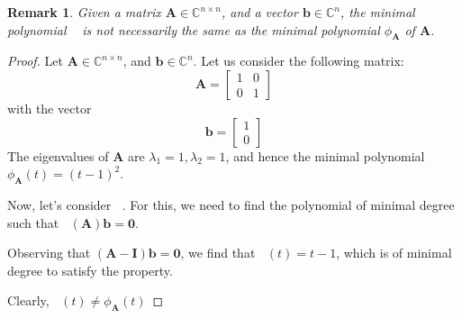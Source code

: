 \documentclass[11pt]{article}
\DeclareMathOperator{\phiAb}{\phi_{\mathbf{A},\mathbf{b}}}
\newtheorem{remark}{Remark}[section]
\numberwithin{equation}{section}
\begin{document}
\begin{remark}
    Given a matrix $\mathbf{A}\in\mathbb{C}^{n\times n}$, and a vector $\mathbf{b}\in\mathbb{C}^n$, the minimal polynomial $\phiAb$ is not necessarily the same as the minimal polynomial $\phi_{\mathbf{A}}$ of $\mathbf{A}$.
\end{remark}
\begin{proof}
    Let $\mathbf{A}\in\mathbb{C}^{n\times n}$, and $\mathbf{b}\in\mathbb{C}^n$. Let us consider the following matrix:
    \begin{equation*}
        \mathbf{A} = \begin{bmatrix}
            1 & 0 \\
            0 & 1
        \end{bmatrix}
    \end{equation*}
    with the vector
    \begin{equation*}
        \mathbf{b} = \begin{bmatrix}
            1 \\
            0
        \end{bmatrix}
    \end{equation*}
    The eigenvalues of $\mathbf{A}$ are $\lambda_1 = 1, \lambda_2 = 1$, and hence the minimal polynomial $\phi_{\mathbf{A}}(t) = (t-1)^2$.

    Now, let's consider $\phiAb$. For this, we need to find the polynomial of minimal degree such that $\phiAb(\mathbf{A})\mathbf{b} = \mathbf{0}$.

    Observing that $(\mathbf{A} - \mathbf{I})\mathbf{b} = \mathbf{0}$, we find that $\phiAb(t) = t - 1$, which is of minimal degree to satisfy the property.

    Clearly, $\phiAb(t) \neq \phi_{\mathbf{A}}(t)$
\end{proof}
\end{document}
